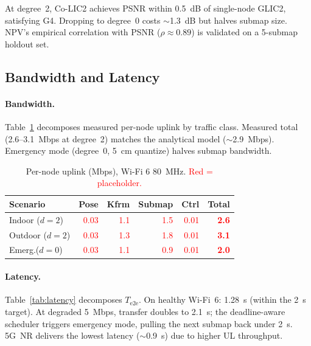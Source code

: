 At degree~2, Co-LIC2 achieves PSNR within 0.5~dB of single-node GLIC2,
satisfying G4. Dropping to degree~0 costs $\sim$1.3~dB but halves submap
size. NPV's empirical correlation with PSNR ($\rho\approx 0.89$) is validated
on a 5-submap holdout set.

\subsection{Bandwidth and Latency}

\label{sec:bw_lat}

\paragraph{Bandwidth.} Table~\ref{tab:bw_measured} decomposes measured per-node
uplink by traffic class. Measured total (2.6--3.1~Mbps at degree~2) matches the
analytical model ($\sim$2.9~Mbps). Emergency mode (degree~0, 5~cm quantize)
halves submap bandwidth.

\begin{table}[t]
  \centering
  \caption{Per-node uplink (Mbps), Wi-Fi 6 80~MHz. \textcolor{red}{Red = placeholder.}}
  \label{tab:bw_measured}
  \footnotesize
  \setlength{\tabcolsep}{3pt}
  \begin{tabular}{@{}lrrrrr@{}}
    \toprule
    Scenario & Pose & Kfrm & Submap & Ctrl & \textbf{Total} \\
    \midrule
    Indoor ($d=2$) & \textcolor{red}{0.03} & \textcolor{red}{1.1} & \textcolor{red}{1.5} & \textcolor{red}{0.01} & \textcolor{red}{\textbf{2.6}} \\
    Outdoor ($d=2$)& \textcolor{red}{0.03} & \textcolor{red}{1.3} & \textcolor{red}{1.8} & \textcolor{red}{0.01} & \textcolor{red}{\textbf{3.1}} \\
    Emerg.\@ ($d=0$) & \textcolor{red}{0.03} & \textcolor{red}{1.1} & \textcolor{red}{0.9} & \textcolor{red}{0.01} & \textcolor{red}{\textbf{2.0}} \\
    \bottomrule
  \end{tabular}
\end{table}

\paragraph{Latency.} Table~\ref{tab:latency} decomposes $T_{\text{e2e}}$.
On healthy Wi-Fi~6: 1.28~s (within the 2~s target). At degraded 5~Mbps,
transfer doubles to 2.1~s; the deadline-aware scheduler triggers emergency
mode, pulling the next submap back under 2~s. 5G~NR delivers the lowest
latency ($\sim$0.9~s) due to higher UL throughput.

